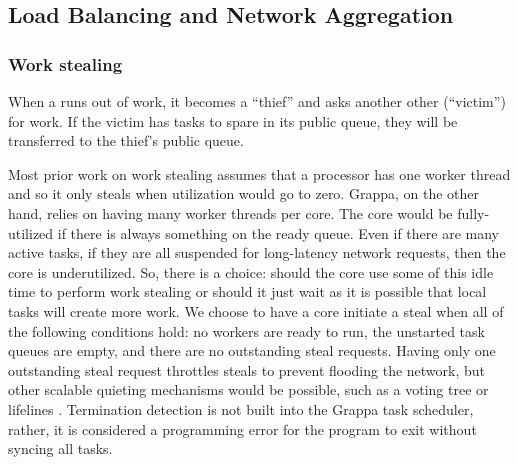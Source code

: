 

\subsection{Load Balancing and Network Aggregation}

\subsubsection{Work stealing} \label{subsec:implementation-worksteal}

When a  runs out of work, it becomes a ``thief''
and asks another other  (``victim'') for work.
If the victim has tasks to spare in its public queue, they will be
transferred to the thief's public queue.

Most prior work on work stealing assumes that a processor has one worker
thread and so it only steals when utilization would go to zero. Grappa,
on the other hand, relies on having many worker threads per core. The
core would be fully-utilized if there is always something on the ready
queue. Even if there are many active tasks, if they are all suspended
for long-latency network requests, then the core is underutilized. So,
there is a choice: should the core use some of this idle time to perform
work stealing or should it just wait as it is possible that local tasks
will create more work. We choose to have a core initiate a steal when
all of the following conditions hold: no workers are ready to run, the
unstarted task queues are empty, and there are no outstanding steal
requests. Having only one outstanding steal request throttles steals to
prevent flooding the network, but other scalable quieting mechanisms
would be possible, such as a voting
tree\cite{scalableWorkStealingOrCilk98} or lifelines \cite{lifelines}.
Termination detection is not built into the Grappa task scheduler,
rather, it is considered a programming error for the program to exit
without syncing all tasks.


